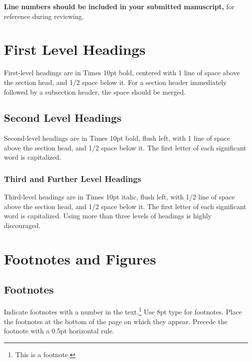 \documentclass{article}
\begin{document}
\textbf{Line numbers should be included in your submitted manuscript,} for reference during reviewing.

\section{First Level Headings}

First-level headings are in Times 10pt bold, centered with 1 line of space above the section head, and 1/2 space below it. For a section header immediately followed by a subsection header, the space should be merged.

\subsection{Second Level Headings}

Second-level headings are in Times 10pt bold, flush left, with 1 line of space above the section head, and 1/2 space below it. The first letter of each significant word is capitalized.

\subsubsection{Third and Further Level Headings}

Third-level headings are in Times 10pt italic, flush left, with 1/2 line of space above the section head, and 1/2 space below it. The first letter of each significant word is capitalized. Using more than three levels of headings is highly discouraged.

\section{Footnotes and Figures}

\subsection{Footnotes}

Indicate footnotes with a number in the text.\footnote{This is a footnote.} Use 8pt type for footnotes. Place the footnotes at the bottom of the page on which they appear. Precede the footnote with a 0.5pt horizontal rule.
\end{document}
